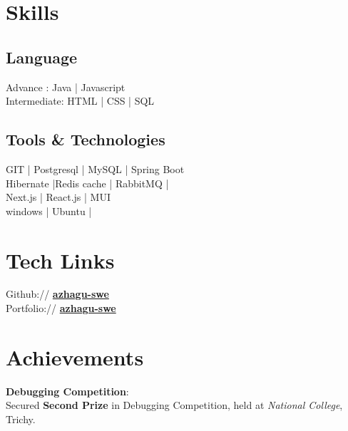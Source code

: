 \documentclass[]{azhagu-swe-resume-openfont}
\begin{document}
\begin{minipage}[t]{0.33\textwidth}
\section{Skills}
\subsection{Language}
 Advance : Java | Javascript \\
 Intermediate: HTML | CSS | SQL \\ 
\subsection{Tools \& Technologies}
 GIT | Postgresql | MySQL | Spring Boot \\
 Hibernate |Redis cache | RabbitMQ | \\ 
 Next.js | React.js | MUI\\
 windows | Ubuntu |\\
 
\sectionsep


\section{Tech Links} 
Github:// \href{https://github.com/azhagu-swe}{\bf azhagu-swe} \\
Portfolio://  \href{https://azhagu-swe.github.io/portfolio/}{\bf azhagu-swe} \\


\section{Achievements}
 \textbf{Debugging Competition}: \\ Secured \textbf{Second Prize} in Debugging Competition, held at \textit{National College}, Trichy.
\sectionsep



\end{minipage}
\end{document}
